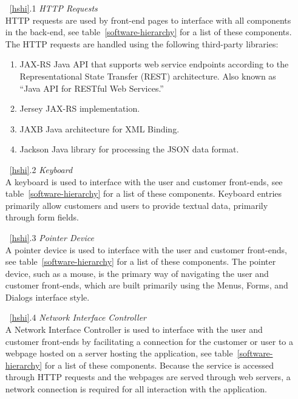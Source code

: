 \documentclass{article}
\newcommand{\br}{\vspace{2mm}}
\begin{document}
\begin{enumerate}
    \item[~\ref{hshi}.1 ] \emph{HTTP Requests}\br\\
        HTTP requests are used by front-end pages to interface with all
        components in the back-end, see table~\ref{software-hierarchy} for a
        list of these components.  The HTTP requests are handled using the
        following third-party libraries:
        \begin{enumerate}
            \item JAX-RS
                Java API that supports web service endpoints according to the
                Representational State Transfer (REST) architecture.  Also known
                as ``Java API for RESTful Web Services.''
            \item Jersey
                JAX-RS implementation.
            \item JAXB
                Java architecture for XML Binding.
            \item Jackson
                Java library for processing the JSON data format.
        \end{enumerate}
    \item[~\ref{hshi}.2 ] \emph{Keyboard}\br\\
        A keyboard is used to interface with the user and customer front-ends,
        see table~\ref{software-hierarchy} for a list of these components.  Keyboard
        entries primarily allow customers and users to provide textual data,
        primarily through form fields.
    \item[~\ref{hshi}.3 ] \emph{Pointer Device}\br\\
        A pointer device is used to interface with the user and customer
        front-ends, see table~\ref{software-hierarchy} for a list of these
        components.  The pointer device, such as a mouse, is the primary
        way of navigating the user and customer front-ends, which are built
        primarily using the Menus, Forms, and Dialogs interface style.
    \item[~\ref{hshi}.4 ] \emph{Network Interface Controller}\br\\
        A Network Interface Controller is used to interface with the user and
        customer front-ends by facilitating a connection for the customer or
        user to a webpage hosted on a server hosting the application, see
        table~\ref{software-hierarchy} for a list of these components.  Because
        the service is accessed through HTTP requests and the webpages are
        served through web servers, a network connection is required for all
        interaction with the application.
\end{enumerate}
\end{document}
